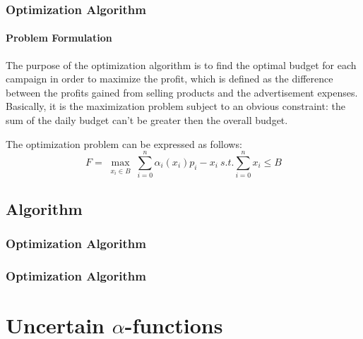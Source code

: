 \documentclass[11pt]{beamer}
\begin{document}

\begin{frame}

\frametitle{Optimization Algorithm}
\framesubtitle{Problem Formulation}

The purpose of the optimization algorithm is to find the optimal budget for each campaign in order to maximize the profit, which is defined as the difference between the profits gained from selling products and the advertisement expenses.
Basically, it is the maximization problem subject to an obvious constraint: the sum of the daily budget can't be greater then the overall budget.

The optimization problem can be expressed as follows:
\begin{displaymath}
F=\max_{\substack{x_i\in B}} \sum_{i=0}^n \alpha_i(x_i)p_i-x_i \ s.t. \sum_{i=0}^n x_i\leq B
\end{displaymath}

\end{frame}


\subsection{Algorithm}


\begin{frame}

\frametitle{Optimization Algorithm}
\framesubtitle{}

\end{frame}


\begin{frame}

\frametitle{Optimization Algorithm}
\framesubtitle{}

\end{frame}


\AtBeginSection[]
{
\begin{frame}{}
    \tableofcontents[sections={\thesection}]
\end{frame}
}


\section{Uncertain $\alpha$-functions}
\end{document}
